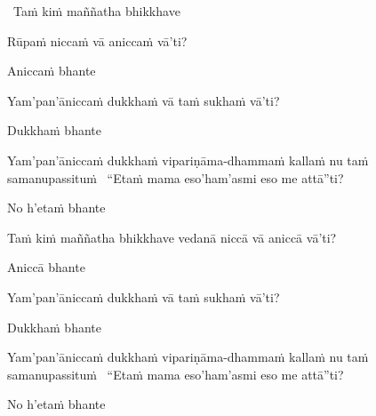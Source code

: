 \begin{leader-pali}
  \anglebracketleft\ \hspace{-0.5mm}Taṁ kiṁ maññatha bhikkhave \hspace{-0.5mm}\anglebracketright\
\end{leader-pali}
\begin{pali-hang-together}
  Rūpaṁ niccaṁ vā aniccaṁ vā'ti?
\end{pali-hang-together}
\begin{pali-hang-together}
  Aniccaṁ bhante
\end{pali-hang-together}
\begin{pali-hang-together}
  Yam'pan'āniccaṁ dukkhaṁ vā taṁ sukhaṁ vā'ti?
\end{pali-hang-together}
\begin{pali-hang-together}
  Dukkhaṁ bhante
\end{pali-hang-together}
\begin{pali-hang-together}
  Yam'pan'āniccaṁ dukkhaṁ vipariṇāma-dhammaṁ kallaṁ nu taṁ samanupassituṁ \breathmark\ ``Etaṁ mama eso'ham'asmi eso me attā''ti?
\end{pali-hang-together}
\begin{pali-hang-together}
  No h'etaṁ bhante
\end{pali-hang-together}

\begin{pali-hang}
  Taṁ kiṁ maññatha bhikkhave vedanā niccā vā aniccā vā'ti?
\end{pali-hang}
\begin{pali-hang-together}
  Aniccā bhante
\end{pali-hang-together}
\begin{pali-hang-together}
  Yam'pan'āniccaṁ dukkhaṁ vā taṁ sukhaṁ vā'ti?
\end{pali-hang-together}
\begin{pali-hang-together}
  Dukkhaṁ bhante
\end{pali-hang-together}
\begin{pali-hang-together}
  Yam'pan'āniccaṁ dukkhaṁ vipariṇāma-dhammaṁ kallaṁ nu taṁ samanupassituṁ \breathmark\ ``Etaṁ mama eso'ham'asmi eso me attā''ti?
\end{pali-hang-together}
\begin{pali-hang-together}
  No h'etaṁ bhante
\end{pali-hang-together}

